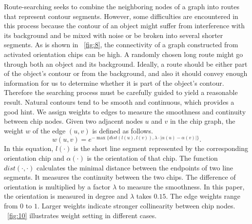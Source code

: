 \documentclass[journal]{IEEEtran}
\begin{document}
Route-searching seeks to combine the neighboring nodes of a graph into routes that represent contour segments. 
However, some difficulties are encountered in this process because the contour of an object might suffer from interference with its background and be mixed with noise or be broken into several shorter segments.
As is shown in \figurename~\ref{fig:8}, 
the connectivity of a graph constructed from activated orientation chips can be high.
A randomly chosen long route might go through both an object and its background.
Ideally, a route should be either part of the object's contour or from the background,
and also it should convey enough information for us to determine whether it is part of the object's contour.
Therefore the searching process must be carefully guided to yield a reasonable result.
Natural contours tend to be smooth and continuous, which provides a good hint.
We assign weights to edges to measure the smoothness and continuity between chip nodes.
Given two adjacent nodes $u$ and $v$ in the chip graph,
the weight $w$ of the edge $(u,v)$ is defined as follows.
\begin{equation}
w(u,v) = e^{-\max\{dist(l(u), l(v)),\lambda\cdot|\alpha(u)-\alpha(v)|\}}.
\end{equation}
In this equation, $l(\cdot)$ is the short line segment represented by the corresponding orientation chip
and $\alpha(\cdot)$ is the orientation of that chip.
The function $dist(\cdot,\cdot)$ calculates the minimal distance between the endpoints of two line segments.
It measures the continuity between the two chips.
The difference of orientation is multiplied by a factor $\lambda$ to measure the smoothness.
In this paper, the orientation is measured in degree and $\lambda$ takes $0.15$.
The edge weights range from $0$ to $1$.
Larger weights indicate stronger collinearity between chip nodes.
\figurename~\ref{fig:10} illustrates weight setting in different cases.
\end{document}
